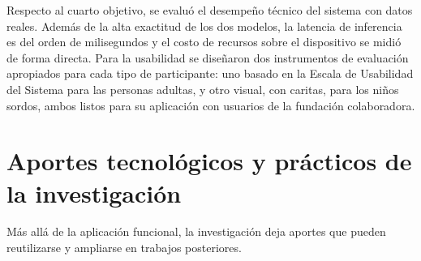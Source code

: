 Respecto al cuarto objetivo, se evaluó el desempeño técnico del sistema con datos reales. Además de la alta exactitud de los dos modelos, la latencia de inferencia es del orden de milisegundos y el costo de recursos sobre el dispositivo se midió de forma directa. Para la usabilidad se diseñaron dos instrumentos de evaluación apropiados para cada tipo de participante: uno basado en la Escala de Usabilidad del Sistema para las personas adultas, y otro visual, con caritas, para los niños sordos, ambos listos para su aplicación con usuarios de la fundación colaboradora.

\section{Aportes tecnológicos y prácticos de la investigación}

Más allá de la aplicación funcional, la investigación deja aportes que pueden reutilizarse y ampliarse en trabajos posteriores.

